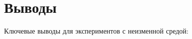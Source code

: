 \documentclass[a4paper]{article}
\begin{document}
  

  









  

  

  

\section {Выводы}

Ключевые выводы для экспериментов с неизменной средой:
\end{document}
